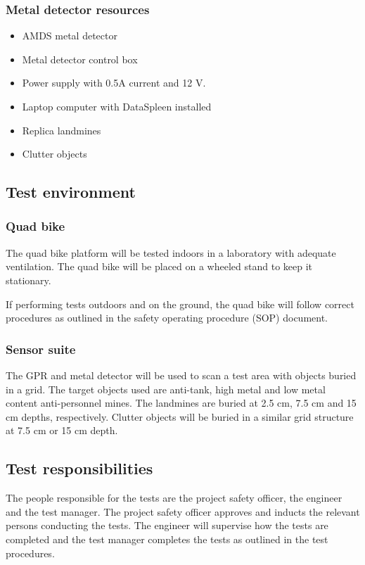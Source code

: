 \documentclass[main.tex]{subfiles}
\begin{document}
\begin{appendices}
\begin{itemize}
\end{itemize} 

\subsubsection{Metal detector resources}
\begin{itemize}
\item AMDS metal detector
\item Metal detector control box
\item Power supply with 0.5A current and 12 V. 
\item Laptop computer with DataSpleen installed
\item Replica landmines
\item Clutter objects

\end{itemize} 

\subsection{Test environment}
\subsubsection{Quad bike}
The quad bike platform will be tested indoors in a laboratory with adequate ventilation. The quad bike will be placed on a wheeled stand to keep it stationary. 

If performing tests outdoors and on the ground, the quad bike will follow correct procedures as outlined in the safety operating procedure (SOP) document. 

\subsubsection{Sensor suite}
The GPR and metal detector will be used to scan a test area with objects buried in a grid. The target objects used are anti-tank, high metal and low metal content anti-personnel mines. The landmines are buried at 2.5 cm, 7.5 cm and 15 cm depths,  respectively. Clutter objects will be buried in a similar grid structure at 7.5 cm or 15 cm depth.

\subsection{Test responsibilities}
The people responsible for the tests are the project safety officer, the engineer and the test manager. The project safety officer approves and inducts the relevant persons conducting the tests. The engineer will supervise how the tests are completed and the test manager completes the tests as outlined in the test procedures.  


\end{appendices}
\end{document}
